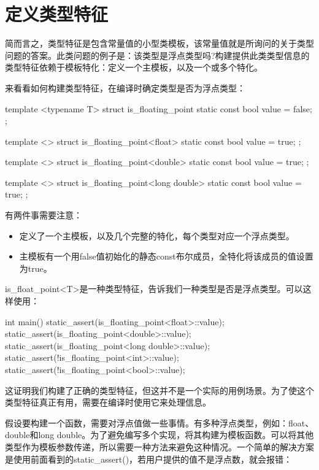 \section{定义类型特征}
简而言之，类型特征是包含常量值的小型类模板，该常量值就是所询问的关于类型问题的答案。此类问题的例子是：该类型是浮点类型吗?构建提供此类类型信息的类型特征依赖于模板特化：定义一个主模板，以及一个或多个特化。

来看看如何构建类型特征，在编译时确定类型是否为浮点类型：

\begin{cpp}
template <typename T>
struct is_floating_point
{
	static const bool value = false;
};

template <>
struct is_floating_point<float>
{
	static const bool value = true;
};

template <>
struct is_floating_point<double>
{
	static const bool value = true;
};

template <>
struct is_floating_point<long double>
{
	static const bool value = true;
};
\end{cpp}

有两件事需要注意：

\begin{itemize}
\item
定义了一个主模板，以及几个完整的特化，每个类型对应一个浮点类型。

\item
主模板有一个用false值初始化的静态const布尔成员，全特化将该成员的值设置为true。
\end{itemize}

is\_float\_point<T>是一种类型特征，告诉我们一种类型是否是浮点类型。可以这样使用：

\begin{cpp}
int main()
{
	static_assert(is_floating_point<float>::value);
	static_assert(is_floating_point<double>::value);
	static_assert(is_floating_point<long double>::value);
	static_assert(!is_floating_point<int>::value);
	static_assert(!is_floating_point<bool>::value);
}
\end{cpp}

这证明我们构建了正确的类型特征，但这并不是一个实际的用例场景。为了使这个类型特征真正有用，需要在编译时使用它来处理信息。

假设要构建一个函数，需要对浮点值做一些事情。有多种浮点类型，例如：float、double和long double。为了避免编写多个实现，将其构建为模板函数。可以将其他类型作为模板参数传递，所以需要一种方法来避免这种情况。一个简单的解决方案是使用前面看到的static\_assert()，若用户提供的值不是浮点数，就会报错：

